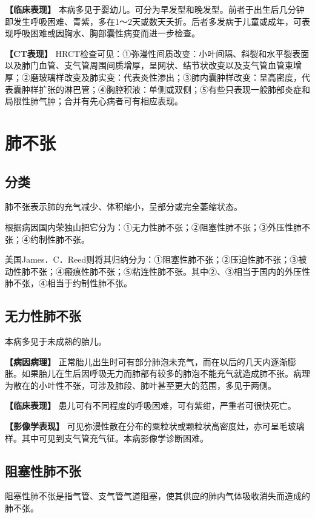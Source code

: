 \textbf{【临床表现】}
本病多见于婴幼儿。可分为早发型和晚发型。前者于出生后几分钟即发生呼吸困难、青紫，多在1～2天或数天夭折。后者多发病于儿童或成年，可表现呼吸困难或因胸水、胸部囊性病变而进一步检查。

\textbf{【CT表现】}
HRCT检查可见：①弥漫性间质改变：小叶间隔、斜裂和水平裂表面以及肺门血管、支气管周围间质增厚，呈网状、结节状改变以及支气管血管束增厚；②磨玻璃样改变及肺实变：代表炎性渗出；③肺内囊肿样改变：呈高密度，代表囊肿样扩张的淋巴管；④胸腔积液：单侧或双侧；⑤有些只表现一般肺部炎症和局限性肺气肿；合并有先心病者可有相应表现。

\section{肺不张}

\subsection{分类}

肺不张表示肺的充气减少、体积缩小，呈部分或完全萎缩状态。

根据病因国内荣独山把它分为：①无力性肺不张；②阻塞性肺不张；③外压性肺不张；④约制性肺不张。

美国James．C．Reed则将其归纳分为：①阻塞性肺不张；②压迫性肺不张；③被动性肺不张；④瘢痕性肺不张；⑤粘连性肺不张。其中②、③相当于国内的外压性肺不张，④相当于约制性肺不张。

\subsection{无力性肺不张}

本病多见于未成熟的胎儿。

\textbf{【病因病理】}
正常胎儿出生时可有部分肺泡未充气，而在以后的几天内逐渐膨胀。如果胎儿在生后因呼吸无力而肺部有较多的肺泡不能充气就造成肺不张。病理为散在的小叶性不张，可涉及肺段、肺叶甚至更大的范围，多见于两侧。

\textbf{【临床表现】}
患儿可有不同程度的呼吸困难，可有紫绀，严重者可很快死亡。

\textbf{【影像学表现】}
可见弥漫性散在分布的粟粒状或颗粒状高密度灶，亦可呈毛玻璃样。其中可见到支气管充气征。本病影像学诊断困难。

\subsection{阻塞性肺不张}

阻塞性肺不张是指气管、支气管气道阻塞，使其供应的肺内气体吸收消失而造成的肺不张。

